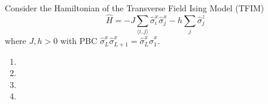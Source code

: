 

Consider the Hamiltonian of the Transverse Field Ising Model (TFIM)
\begin{equation*}
	\hat{H} = - J \sum_{\langle i,j\rangle}
		\hat{\sigma}^x_i \hat{\sigma}^x_j
	- h \sum_j \hat{\sigma}_j^z
\end{equation*}
where $J,h>0$ with PBC $\hat{\sigma}_L^x \hat{\sigma}_{L+1}^x = \hat{\sigma}_{L}^x \hat{\sigma}_1^x$.


\begin{enumerate}
	\item 
	\item 
	\item  \newpage
	\item 
\end{enumerate}

